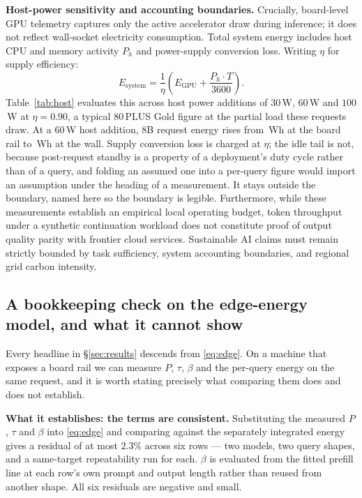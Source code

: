 \documentclass[conference]{IEEEtran}
\begin{document}
\textbf{Host-power sensitivity and accounting boundaries.}
Crucially, board-level GPU telemetry captures only the active accelerator draw
during inference; it does not reflect wall-socket electricity consumption. Total
system energy includes host CPU and memory activity $P_h$ and power-supply
conversion loss. Writing $\eta$ for supply efficiency:
\begin{equation}
E_{\text{system}} = \frac{1}{\eta}\left(E_{\text{GPU}} + \frac{P_h \cdot T}{3600}\right).
\label{eq:system}
\end{equation}
Table~\ref{tab:host} evaluates this across host power additions of $30$\,W,
$60$\,W and $100$\,W at $\eta = 0.90$, a typical 80\,PLUS Gold figure at the
partial load these requests draw. At a $60$\,W host addition, 8B request energy
rises from \RtxEightHostZero{}\,Wh at the board rail to
\RtxEightHostSixty{}\,Wh at the wall. Supply conversion loss is charged at
$\eta$; the idle tail is not, because post-request
standby is a property of a deployment's duty cycle rather than of a query, and
folding an assumed one into a per-query figure would import an assumption under
the heading of a measurement. It stays outside the boundary, named here so the
boundary is legible.
Furthermore, while these measurements establish an empirical local operating
budget, token throughput under a synthetic continuation workload does not
constitute proof of output quality parity with frontier cloud services.
Sustainable AI claims must remain strictly bounded by task sufficiency, system
accounting boundaries, and regional grid carbon intensity.

\subsection{A bookkeeping check on the edge-energy model, and what it cannot show}
\label{sec:formcheck}
Every headline in \S\ref{sec:results} descends from \eqref{eq:edge}. On a
machine that exposes a board rail we can measure $P$, $\tau$, $\beta$ and the
per-query energy on the same request, and it is worth stating precisely what
comparing them does and does not establish.

\textbf{What it establishes: the terms are consistent.} Substituting the
measured $P$, $\tau$ and $\beta$ into \eqref{eq:edge} and comparing against the
separately integrated energy gives a residual of at most $\mathbf{2.3\%}$ across
six rows --- two models, two query shapes, and a same-target repeatability run
for each. $\beta$ is evaluated from the fitted prefill line at each row's own prompt
and output length rather than reused from another shape. All six residuals are
negative and small.
\end{document}
